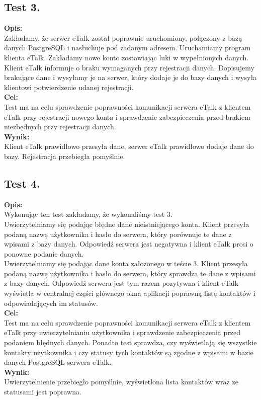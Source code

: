 \documentclass[a4paper,12pt]{article}
\begin{document}
\subsection[Test 3.]{Test 3.}
\textbf{Opis:}\\
Zakładamy, że serwer eTalk został poprawnie uruchomiony, połączony z bazą danych PostgreSQL i nasłuchuje pod zadanym adresem.
Uruchamiamy program klienta eTalk. Zakładamy nowe konto zostawiając luki w wypełnionych danych. Klient eTalk informuje o braku wymaganych przy rejestracji danych. Dopisujemy brakujące dane i wysyłamy je na serwer, który dodaje je do bazy danych i wysyła klientowi potwierdzenie udanej rejestracji.\\
\textbf{Cel:}\\
Test ma na celu sprawdzenie poprawności komunikacji serwera eTalk z klientem eTalk przy rejestracji nowego konta i sprawdzenie zabezpieczenia przed brakiem niezbędnych przy rejestracji danych.\\
\textbf{Wynik:}\\
Klient eTalk prawidłowo przesyła dane, serwer eTalk prawidłowo dodaje dane do bazy. Rejestracja przebiegła pomyślnie.

\subsection[Test 4.]{Test 4.}
\textbf{Opis:}\\
Wykonując ten test zakładamy, że wykonaliśmy test 3.\\
Uwierzytelniamy się podając błędne dane nieistniejącego konta.
Klient przesyła podaną nazwę użytkownika i hasło do serwera, który porównuje te dane z wpisami z bazy danych.
Odpowiedź serwera jest negatywna i klient eTalk prosi o ponowne podanie danych.\\
Uwierzytelniamy się podając dane konta założonego w teście 3.
Klient przesyła podaną nazwę użytkownika i hasło do serwera, który sprawdza te dane z wpisami z bazy danych.
Odpowiedź serwera jest tym razem pozytywna i klient eTalk wyświetla w centralnej części głównego okna aplikacji poprawną listę kontaktów i odpowiadających im statusów.\\
\textbf{Cel:}\\
Test ma na celu sprawdzenie poprawności komunikacji serwera eTalk z klientem eTalk przy uwierzytelnianiu użytkownika i sprawdzenie zabezpieczenia przed podaniem błędnych danych. Ponadto test sprawdza, czy wyświetlają się wszystkie kontakty użytkownika i czy statusy tych kontaktów są zgodne z wpisami w bazie danych PostgreSQL serwera eTalk.\\
\textbf{Wynik:}\\
Uwierzytelnienie przebiegło pomyślnie, wyświetlona lista kontaktów wraz ze statusami jest poprawna.
\end{document}
